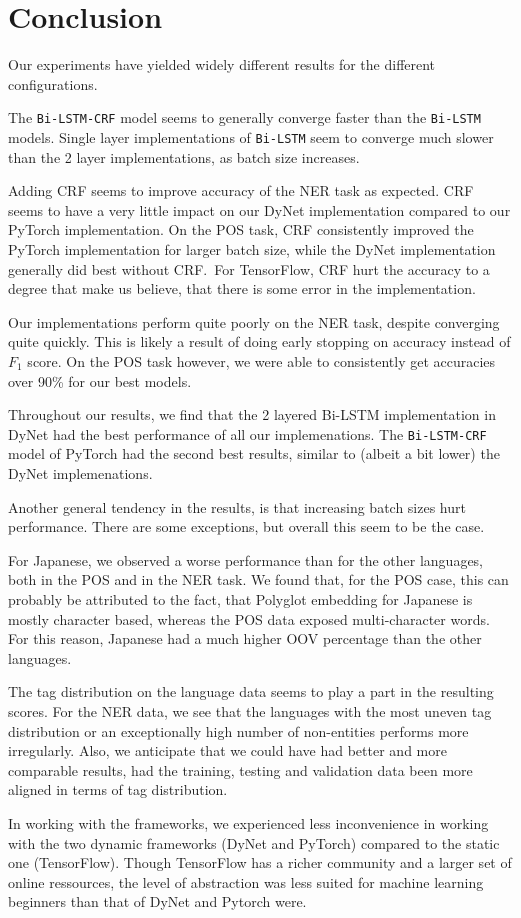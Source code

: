

\section{Conclusion}

Our experiments have yielded widely different results for the different
configurations.

The \texttt{Bi-LSTM-CRF} model seems to generally converge faster than the
\texttt{Bi-LSTM} models. Single layer implementations of \texttt{Bi-LSTM}
seem to converge much slower than the 2 layer implementations, as batch size
increases.

Adding CRF seems to improve accuracy of the NER task as expected. CRF seems to
have a very little impact on our DyNet implementation compared to our PyTorch
implementation. On the POS task, CRF consistently improved the PyTorch
implementation for larger batch size, while the DyNet implementation generally
did best without CRF.\ For TensorFlow, CRF hurt the accuracy to a degree that
make us believe, that there is some error in the implementation.

Our implementations perform quite poorly on the NER task, despite converging
quite quickly. This is likely a result of doing early stopping on accuracy
instead of $F_1$ score. On the POS task however, we were able to consistently
get accuracies over 90\% for our best models.

Throughout our results, we find that the 2 layered Bi-LSTM implementation in
DyNet had the best performance of all our implemenations. The
\texttt{Bi-LSTM-CRF} model of PyTorch had the second best results, similar to
(albeit a bit lower) the DyNet implemenations.

Another general tendency in the results, is that increasing batch sizes hurt
performance. There are some exceptions, but overall this seem to be the case.

For Japanese, we observed a worse performance than for the other languages, both
in the POS and in the NER task. We found that, for the POS case, this can
probably be attributed to the fact, that Polyglot embedding for Japanese is
mostly character based, whereas the POS data exposed multi-character words. For
this reason, Japanese had a much higher OOV percentage than the other languages.

The tag distribution on the language data seems to play a part in the resulting
scores. For the NER data, we see that the languages with the most uneven tag
distribution or an exceptionally high number of non-entities performs more
irregularly. Also, we anticipate that we could have had better and more
comparable results, had the training, testing and validation data been more
aligned in terms of tag distribution.

In working with the frameworks, we experienced less inconvenience in working
with the two dynamic frameworks (DyNet and PyTorch) compared to the static one
(TensorFlow). Though TensorFlow has a richer community and a larger set of
online ressources, the level of abstraction was less suited for machine learning
beginners than that of DyNet and Pytorch were.

\pagebreak
